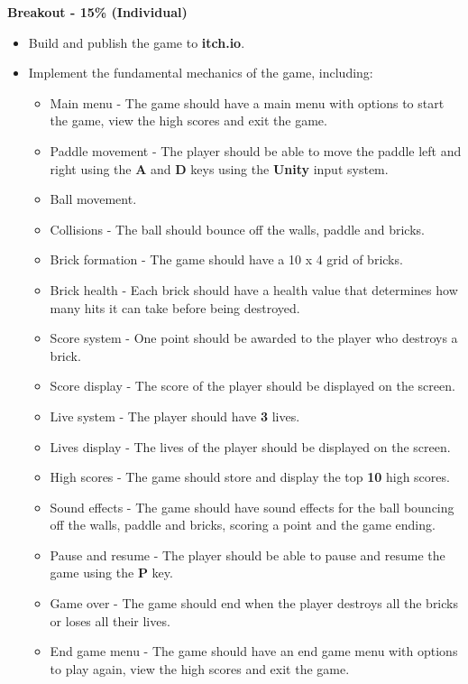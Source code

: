 \documentclass{article}
\begin{document}
\textbf{Breakout - 15\% (Individual)}
\begin{itemize}
    \item Build and publish the game to \textbf{itch.io}.
    \item Implement the fundamental mechanics of the game, including:
    \begin{itemize}
        \item Main menu - The game should have a main menu with options to start the game, view the high scores and exit the game.
        \item Paddle movement - The player should be able to move the paddle left and right using the \textbf{A} and \textbf{D} keys using the \textbf{Unity} input system.
        \item Ball movement.
        \item Collisions - The ball should bounce off the walls, paddle and bricks.
        \item Brick formation - The game should have a 10 x 4 grid of bricks.
        \item Brick health - Each brick should have a health value that determines how many hits it can take before being destroyed.
        \item Score system - One point should be awarded to the player who destroys a brick.
        \item Score display - The score of the player should be displayed on the screen.
        \item Live system - The player should have \textbf{3} lives. 
        \item Lives display - The lives of the player should be displayed on the screen.
        \item High scores - The game should store and display the top \textbf{10} high scores.
        \item Sound effects - The game should have sound effects for the ball bouncing off the walls, paddle and bricks, scoring a point and the game ending.
        \item Pause and resume - The player should be able to pause and resume the game using the \textbf{P} key.
        \item Game over - The game should end when the player destroys all the bricks or loses all their lives.
        \item End game menu - The game should have an end game menu with options to play again, view the high scores and exit the game. 
    \end{itemize}
	

\end{itemize}
\end{document}
